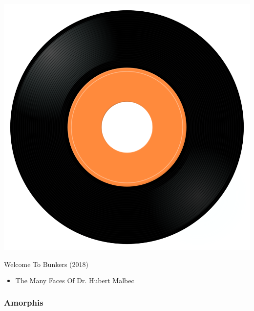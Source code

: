 \begin{minipage}[t]{0.25\textwidth}\vspace{0pt}
\captionsetup{type=figure}
\includegraphics[width=\textwidth]{Images/cover.png}
\caption*{Welcome To Bunkers (2018)}
\end{minipage}
\begin{minipage}[t]{0.25\textwidth}\vspace{0pt}
\begin{itemize}[nosep,leftmargin=1em,labelwidth=*,align=left]
	\setlength{\itemsep}{0pt}
	\item The Many Faces Of Dr. Hubert Malbec
\end{itemize}
\end{minipage}

\subsubsection{Amorphis}

